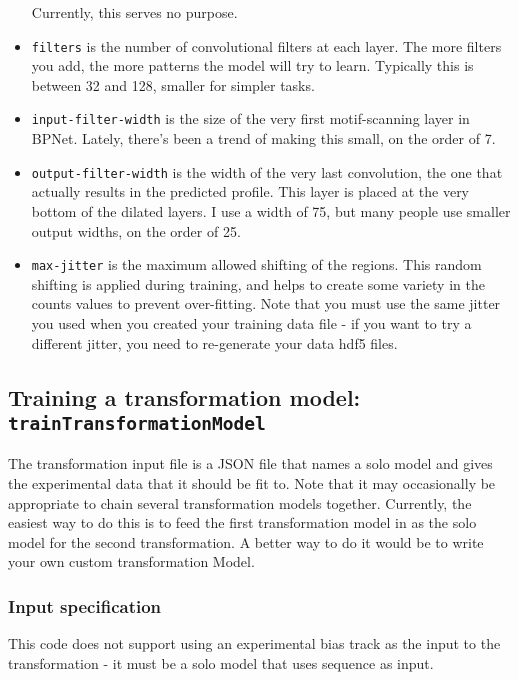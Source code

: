\documentclass{article}
\begin{document}
\begin{itemize}
        Currently, this serves no purpose.
    \item \texttt{filters} is the number of convolutional filters at each layer.
        The more filters you add, the more patterns the model will try to learn.
        Typically this is between 32 and 128, smaller for simpler tasks.
    \item \texttt{input-filter-width} is the size of the very first
        motif-scanning layer in BPNet.
        Lately, there's been a trend of making this small, on the order of 7.
    \item \texttt{output-filter-width} is the width of the very last
        convolution, the one that actually results in the predicted profile.
        This layer is placed at the very bottom of the dilated layers.
        I use a width of 75, but many people use smaller output widths, on the
        order of 25.
    \item \texttt{max-jitter} is the maximum allowed shifting of the regions.
        This random shifting is applied during training, and helps to create
        some variety in the counts values to prevent over-fitting.
        Note that you must use the same jitter you used when you created your
        training data file - if you want to try a different jitter, you need to
        re-generate your data hdf5 files.
\end{itemize}

\newpage

\subsection{Training a transformation model: \texttt{trainTransformationModel}}\label{prog:trainTransformationModel}

The transformation input file is a JSON file that names a solo model and gives
the experimental data that it should be fit to.
Note that it may occasionally be appropriate to chain several transformation
models together.
Currently, the easiest way to do this is to feed the first transformation model
in as the solo model for the second transformation.
A better way to do it would be to write your own custom transformation Model.

\subsubsection{Input specification}


This code does not support using an experimental bias track as the input to the
transformation - it must be a solo model that uses sequence as input.
\end{document}
